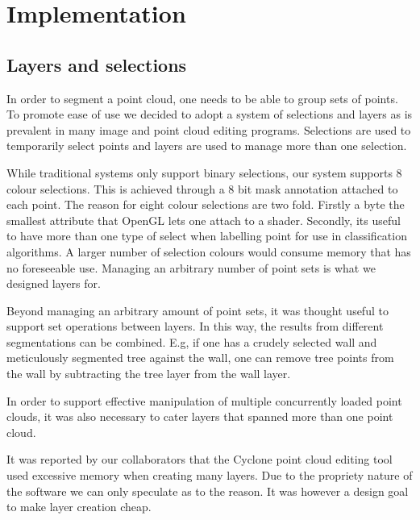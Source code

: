 \chapter{Implementation} \label{ch:implement}



\section{Layers and selections}
In order to segment a point cloud, one needs to be able to group sets of points. To promote ease of use we decided to adopt a system of selections and layers as is prevalent in many image and point cloud editing programs. Selections are used to temporarily select points and layers are used to manage more than one selection.

While traditional systems only support binary selections, our system supports 8 colour selections. This is achieved through a 8 bit mask annotation attached to each point. The reason for eight colour selections are two fold. Firstly a byte the smallest attribute that OpenGL lets one attach to a shader. Secondly, its useful to have more than one type of select when labelling point for use in classification algorithms. A larger number of selection colours would consume memory that has no foreseeable use. Managing an arbitrary number of point sets is what we designed layers for.

Beyond managing an arbitrary amount of point sets, it was thought useful  to support set operations between layers. In this way, the results from different segmentations can be combined. E.g, if one has a crudely selected wall and meticulously segmented tree against the wall, one can remove tree points from the wall by subtracting the tree layer from the wall layer.

In order to support effective manipulation of multiple concurrently loaded point clouds, it was also necessary to cater layers that spanned more than one point cloud.

It was reported by our collaborators that the Cyclone  point cloud editing tool used excessive memory when creating many layers. Due to the propriety nature of the software we can only speculate as to the reason. It was however a design goal to make layer creation cheap. 

